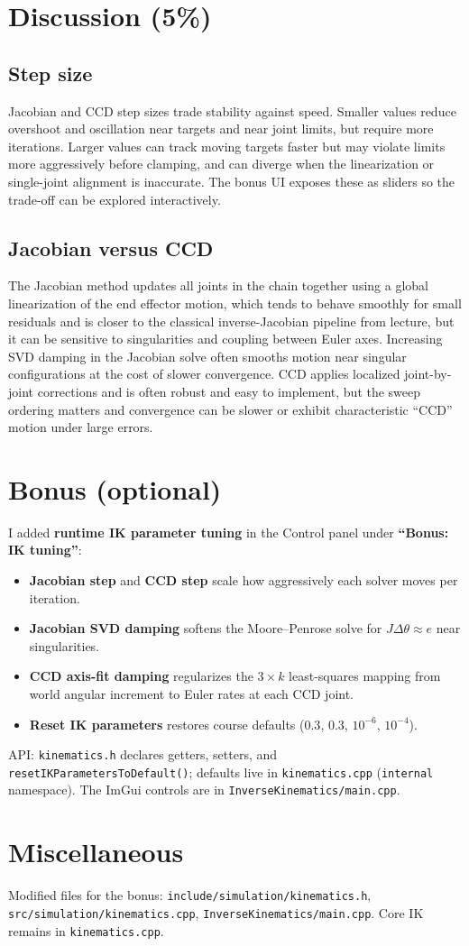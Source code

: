 \documentclass[11pt,a4paper]{article}
\begin{document}
\section{Discussion (5\%)}

\subsection{Step size}
Jacobian and CCD step sizes trade stability against speed.
Smaller values reduce overshoot and oscillation near targets and near joint limits, but require more iterations.
Larger values can track moving targets faster but may violate limits more aggressively before clamping, and
can diverge when the linearization or single-joint alignment is inaccurate.
The bonus UI exposes these as sliders so the trade-off can be explored interactively.

\subsection{Jacobian versus CCD}
The Jacobian method updates all joints in the chain together using a global linearization of the end effector
motion, which tends to behave smoothly for small residuals and is closer to the classical inverse-Jacobian
pipeline from lecture, but it can be sensitive to singularities and coupling between Euler axes.
Increasing SVD damping in the Jacobian solve often smooths motion near singular configurations at the cost of
slower convergence.
CCD applies localized joint-by-joint corrections and is often robust and easy to implement, but the sweep
ordering matters and convergence can be slower or exhibit characteristic ``CCD'' motion under large errors.

\section{Bonus (optional)}

I added \textbf{runtime IK parameter tuning} in the Control panel under \textbf{``Bonus: IK tuning''}:
\begin{itemize}
    \item \textbf{Jacobian step} and \textbf{CCD step} scale how aggressively each solver moves per iteration.
    \item \textbf{Jacobian SVD damping} softens the Moore--Penrose solve for $J\Delta\theta \approx e$ near singularities.
    \item \textbf{CCD axis-fit damping} regularizes the $3\times k$ least-squares mapping from world angular increment
          to Euler rates at each CCD joint.
    \item \textbf{Reset IK parameters} restores course defaults ($0.3$, $0.3$, $10^{-6}$, $10^{-4}$).
\end{itemize}
API: \texttt{kinematics.h} declares getters, setters, and \texttt{resetIKParametersToDefault()}; defaults live in
\texttt{kinematics.cpp} (\texttt{internal} namespace). The ImGui controls are in \texttt{InverseKinematics/main.cpp}.

\section{Miscellaneous}
Modified files for the bonus: \texttt{include/simulation/kinematics.h}, \texttt{src/simulation/kinematics.cpp},
\texttt{InverseKinematics/main.cpp}. Core IK remains in \texttt{kinematics.cpp}.
\end{document}
